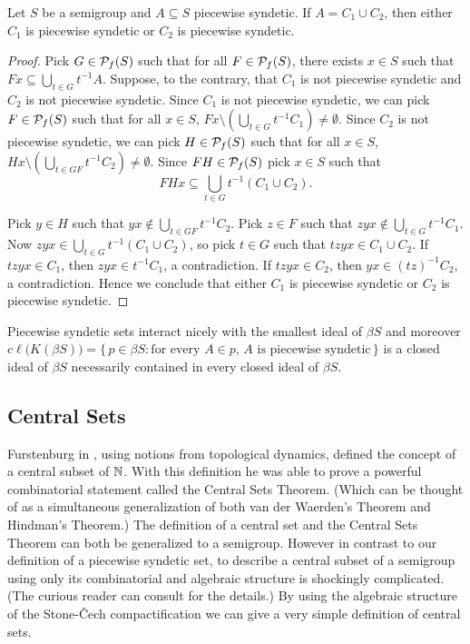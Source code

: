\begin{thm}
  \label{prop:psReg}
  Let $S$ be a semigroup and $A \subseteq S$ piecewise syndetic.
  If $A = C_1 \cup C_2$, then either $C_1$ is piecewise syndetic or $C_2$ is piecewise syndetic.
\end{thm}
\begin{proof}
  Pick $G \in \mathcal{P}_f(S)$ such that for all $F \in \mathcal{P}_f(S)$, there exists $x \in S$ such that $Fx \subseteq \bigcup_{t \in G} t^{-1}A$. 
  Suppose, to the contrary, that $C_1$ is not piecewise syndetic and $C_2$ is not piecewise syndetic. 
  Since $C_1$ is not piecewise syndetic, we can pick $F \in \mathcal{P}_f(S)$ such that for all $x \in S$, $Fx \setminus (\bigcup_{t \in G} t^{-1}C_1) \ne \emptyset$. 
  Since $C_2$ is not piecewise syndetic, we can pick $H \in \mathcal{P}_f(S)$ such that for all $x \in S$, $Hx \setminus (\bigcup_{t \in GF} t^{-1}C_2) \ne \emptyset$.
  Since $FH \in \mathcal{P}_f(S)$ pick $x \in S$ such that 
  \[
    FHx \subseteq \bigcup_{t \in G} t^{-1}(C_1 \cup C_2). 
  \]
  
  Pick $y \in H$ such that $yx \not\in \bigcup_{t \in GF} t^{-1}C_2$. 
  Pick $z \in F$ such that $zyx \not\in \bigcup_{t \in G} t^{-1}C_1$. 
  Now $zyx \in \bigcup_{t \in G} t^{-1}(C_1 \cup C_2)$, so pick $t \in G$ such that $tzyx \in C_1 \cup C_2$. 
  If $tzyx \in C_1$, then $zyx \in t^{-1}C_1$, a contradiction.
  If $tzyx \in C_2$, then $yx \in (tz)^{-1}C_2$, a contradiction.
  Hence we conclude that either $C_1$ is piecewise syndetic or $C_2$ is piecewise syndetic.
\end{proof}

  Piecewise syndetic sets interact nicely with the smallest ideal of $\beta S$ \cite[Theorem 4.40]{Hindman:1998fk} and moreover $c\ell\bigl(K(\beta S)\bigr) = \{\, p \in \beta S : \mbox{for every $A \in p$, $A$ is piecewise syndetic} \,\}$ is a closed ideal of $\beta S$ \cite[Corollary 4.41 and Theorem 4.44]{Hindman:1998fk} necessarily contained in every closed ideal of $\beta S$. 

\subsection{Central Sets}
\label{central-sets}

Furstenburg in \cite[Chapter 8]{Furstenberg:1981fk}, using notions from topological dynamics, defined the concept of a central subset of $\mathbb{N}$. 
With this definition he was able to prove a powerful combinatorial statement called the Central Sets Theorem.
(Which can be thought of as a simultaneous generalization of both van der Waerden's Theorem and Hindman's Theorem.)
The definition of a central set and the Central Sets Theorem can both be generalized to a semigroup.
However in contrast to our definition of a piecewise syndetic set, to describe a central subset of a semigroup using only its combinatorial and algebraic structure is shockingly complicated.%
  (The curious reader can consult \cite[Section 14.5]{Hindman:1998fk} for the details.)
By using the algebraic structure of the Stone-\v{C}ech compactification we can give a very simple definition of central sets.

